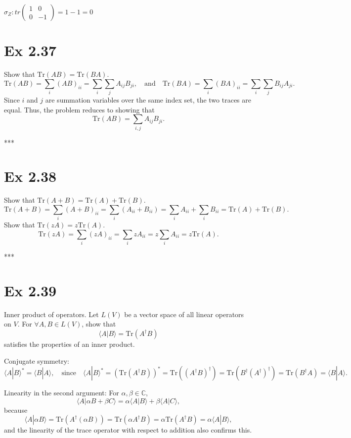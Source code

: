 \documentclass{article}
\newcommand{\0}{{$|0\rangle$}}
\newcommand{\1}{{$|1\rangle$}}
\begin{document}
$\sigma_Z: tr \begin{pmatrix} 1 & 0 \\ 0 & -1 \end{pmatrix} = 1 - 1 = 0$


\newpage
\section*{Ex 2.37 } 
Show that $\text{Tr}(AB) = \text{Tr}(BA)$.  
$$
\text{Tr}(AB) = \sum_i (AB)_{ii} = \sum_i \sum_j A_{ij} B_{ji}, \quad \text{and} \quad \text{Tr}(BA) = \sum_i (BA)_{ii} = \sum_i \sum_j B_{ij} A_{ji}.
$$  
Since $i$ and $j$ are summation variables over the same index set, the two traces are equal. Thus, the problem reduces to showing that  
$$
\text{Tr}(AB) = \sum_{i,j} A_{ij} B_{ji}.
$$

***

\newpage
\section*{Ex 2.38 } 

Show that $\text{Tr}(A+B) = \text{Tr}(A) + \text{Tr}(B)$.  
$$
\text{Tr}(A+B) = \sum_i (A+B)_{ii} = \sum_i (A_{ii} + B_{ii}) = \sum_i A_{ii} + \sum_i B_{ii} = \text{Tr}(A) + \text{Tr}(B).
$$  
Show that $\text{Tr}(zA) = z \text{Tr}(A)$.  
$$
\text{Tr}(zA) = \sum_i (zA)_{ii} = \sum_i z A_{ii} = z \sum_i A_{ii} = z \text{Tr}(A).
$$

***

\newpage
\section*{Ex 2.39 } 
Inner product of operators. Let $L(V)$ be a vector space of all linear operators on $V$. For $\forall A, B \in L(V)$, show that  
$$
\langle A | B \rangle = \text{Tr}(A^\dagger B)
$$
satisfies the properties of an inner product.  

Conjugate symmetry:  
$$
\langle A | B \rangle^* = \langle B | A \rangle, \quad \text{since} \quad \langle A|B \rangle^* = (\text{Tr}(A^\dagger B))^* = \text{Tr}((A^\dagger B)^\dagger) = \text{Tr}(B^\dagger (A^\dagger)^\dagger) = \text{Tr}(B^\dagger A) = \langle B|A \rangle.
$$

Linearity in the second argument: For $\alpha, \beta \in \mathbb{C}$,  
$$
\langle A | \alpha B + \beta C \rangle = \alpha \langle A| B \rangle + \beta \langle A | C \rangle,
$$
because  
$$
\langle A | \alpha B \rangle = \text{Tr}(A^\dagger (\alpha B)) = \text{Tr}(\alpha A^\dagger B) = \alpha \text{Tr}(A^\dagger B) = \alpha \langle A|B \rangle,
$$
and the linearity of the trace operator with respect to addition also confirms this.
\end{document}
